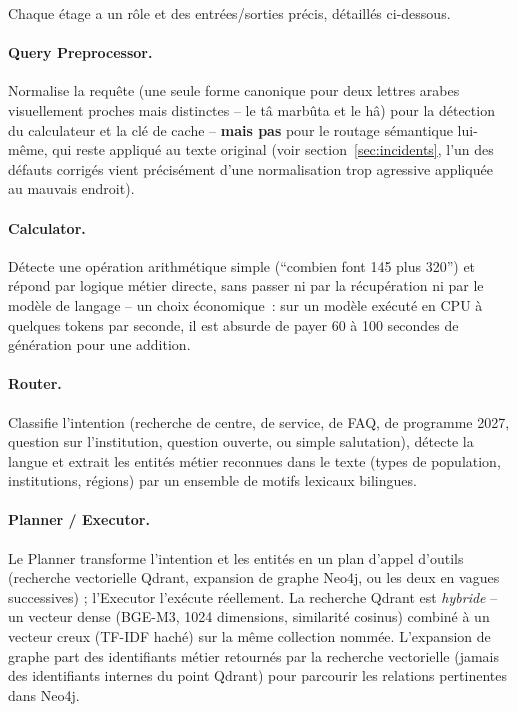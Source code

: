 Chaque étage a un rôle et des entrées/sorties précis, détaillés ci-dessous.

\paragraph{Query Preprocessor.} Normalise la requête (une seule forme canonique pour deux lettres arabes visuellement proches mais distinctes -- le t\^{a} marb\^{u}ta et le h\^{a}) pour la détection du calculateur et la clé de cache -- \textbf{mais pas} pour le routage sémantique lui-même, qui reste appliqué au texte original (voir section~\ref{sec:incidents}, l'un des défauts corrigés vient précisément d'une normalisation trop agressive appliquée au mauvais endroit).

\paragraph{Calculator.} Détecte une opération arithmétique simple (``combien font 145 plus 320'') et répond par logique métier directe, sans passer ni par la récupération ni par le modèle de langage -- un choix économique~: sur un modèle exécuté en CPU à quelques tokens par seconde, il est absurde de payer 60 à 100 secondes de génération pour une addition.

\paragraph{Router.} Classifie l'intention (recherche de centre, de service, de FAQ, de programme 2027, question sur l'institution, question ouverte, ou simple salutation), détecte la langue et extrait les entités métier reconnues dans le texte (types de population, institutions, régions) par un ensemble de motifs lexicaux bilingues.

\paragraph{Planner / Executor.} Le Planner transforme l'intention et les entités en un plan d'appel d'outils (recherche vectorielle Qdrant, expansion de graphe Neo4j, ou les deux en vagues successives) ; l'Executor l'exécute réellement. La recherche Qdrant est \emph{hybride} -- un vecteur dense (BGE-M3, 1024 dimensions, similarité cosinus) combiné à un vecteur creux (TF-IDF haché) sur la même collection nommée. L'expansion de graphe part des identifiants métier retournés par la recherche vectorielle (jamais des identifiants internes du point Qdrant) pour parcourir les relations pertinentes dans Neo4j.

